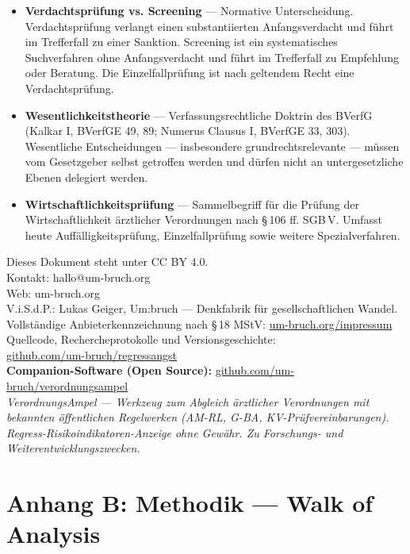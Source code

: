 \documentclass{umbruch-position}
\begin{document}
\begin{sloppypar}
\begin{itemize}[leftmargin=1em, itemsep=0.6em]
  \item \textbf{Verdachtsprüfung vs. Screening} --- Normative Unterscheidung. Verdachtsprüfung verlangt einen substantiierten Anfangsverdacht und führt im Trefferfall zu einer Sanktion. Screening ist ein systematisches Suchverfahren ohne Anfangsverdacht und führt im Trefferfall zu Empfehlung oder Beratung. Die Einzelfallprüfung ist nach geltendem Recht eine Verdachtsprüfung.
  \item \textbf{Wesentlichkeitstheorie} --- Verfassungsrechtliche Doktrin des BVerfG (Kalkar I, BVerfGE 49, 89; Numerus Clausus I, BVerfGE 33, 303). Wesentliche Entscheidungen --- insbesondere grundrechtsrelevante --- müssen vom Gesetzgeber selbst getroffen werden und dürfen nicht an untergesetzliche Ebenen delegiert werden.
  \item \textbf{Wirtschaftlichkeitsprüfung} --- Sammelbegriff für die Prüfung der Wirtschaftlichkeit ärztlicher Verordnungen nach \S\,106 ff. SGB\,V. Umfasst heute Auffälligkeitsprüfung, Einzelfallprüfung sowie weitere Spezialverfahren.
\end{itemize}
\end{sloppypar}


\vspace{1cm}
\begin{center}
Dieses Dokument steht unter CC BY 4.0.\\[1em]
Kontakt: hallo@um-bruch.org\\
Web: um-bruch.org\\
V.i.S.d.P.: Lukas Geiger, Um:bruch --- Denkfabrik f\"ur gesellschaftlichen Wandel. Vollst\"andige Anbieterkennzeichnung nach \S\,18 MStV: \href{https://um-bruch.org/impressum}{um-bruch.org/impressum}\\[0.5em]
Quellcode, Rechercheprotokolle und Versionsgeschichte:\\
\href{https://github.com/um-bruch/regressangst}{github.com/um-bruch/regressangst}\\[0.5em]
\textbf{Companion-Software (Open Source):} \href{https://github.com/um-bruch/verordnungsampel}{github.com/um-bruch/verordnungsampel}\\
\textit{VerordnungsAmpel --- Werkzeug zum Abgleich \"arztlicher Verordnungen mit bekannten \"offentlichen Regelwerken (AM-RL, G-BA, KV-Pr\"ufvereinbarungen). Regress-Risikoindikatoren-Anzeige ohne Gew\"ahr. Zu Forschungs- und Weiterentwicklungszwecken.}
\end{center}

\newpage
\section*{Anhang B: Methodik --- Walk of Analysis}
\label{sec:appendix-methodik}
\end{document}
